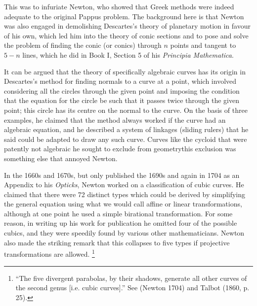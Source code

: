 This was to infuriate Newton, who showed that Greek methods were indeed adequate to the original Pappus problem. The background here is that Newton was also engaged in demolishing Descartes's theory of planetary motion in favour of his own, which led him into the theory of conic sections and to pose and solve the problem of finding the conic (or conics) through $n$ points and tangent to $5-n$ lines, which he did in Book I, Section 5 of his \emph{Principia Mathematica}.~\label{Newtonconics}

It can be argued that the theory of specifically algebraic curves has its origin in Descartes's method for finding normals to a curve at a point, which  involved considering all the circles through the given point and imposing the condition that the equation for the circle be such that it passes twice through the given point; this circle has its centre on the normal to the curve. On the basis of three examples, he claimed that the method always worked  if the curve had an algebraic equation, and he described a system of linkages (sliding rulers) that he said could be adapted to draw any such curve. Curves like the cycloid that were patently not algebraic he sought to exclude from geometry\emdash this exclusion was something else that annoyed Newton.

In the 1660s and 1670s, but only published  the 1690s and again in
1704 as an Appendix to his \emph{Opticks}, Newton worked on a
classification of cubic curves. He claimed that there were 72 distinct
types which could be derived by simplifying the general equation using
what we would call affine or linear transformations, although at one
point he used a simple birational transformation. For some reason, in
writing up his work for publication he omitted four of the possible
cubics, and they were speedily found by various other mathematicians.
Newton also made the striking remark that this collapses to five types
if projective transformations are allowed.%
\footnote{``The five divergent parabolas, by their shadows, generate
  all other curves of the second genus [i.e. cubic curves].'' See
  (Newton  1704) and Talbot (1860, p. 25).}





